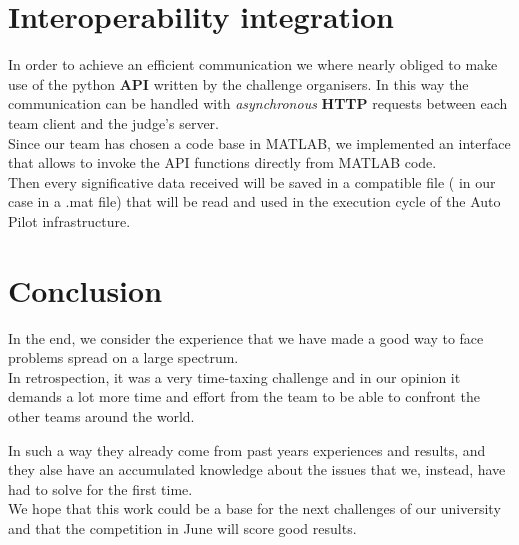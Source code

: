 \documentclass[oneside,onecolumn]{article}
\begin{document}
\section{Interoperability integration}
In order to achieve an efficient communication we where nearly obliged to make
use of the python \textbf{API} written by the challenge organisers. In this way the
communication can be handled with \textit{asynchronous} \textbf{HTTP} requests between each team
client and the judge's server.\\
Since our team has chosen a code base in MATLAB, we implemented an interface
that allows to invoke the API functions directly from MATLAB code.\\
Then every significative data received will be saved in a compatible file ( in
our case in a .mat file) that will be read and used in the execution cycle of the Auto
Pilot infrastructure.



\section{Conclusion}
In the end, we consider the experience that we have made a good way to face
problems spread on a large spectrum.\\
In retrospection, it was a very time-taxing challenge and in our opinion it
demands a lot more time and effort from the team to be able to confront the
other teams around the world.\\\par
In such a way they already  come from past years experiences and results,
and they alse have an accumulated knowledge about the issues that we, instead, have had to
solve for the first time.\\
We hope that this work could be a base for the next challenges of our university
and that the competition in June will score good results.
\end{document}
